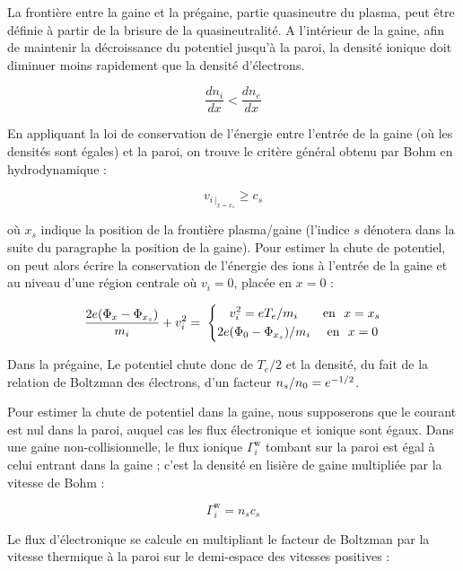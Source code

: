 \begin{refsection}
La frontière entre la gaine et la prégaine, partie quasineutre du plasma, peut
être définie à partir de la brisure de la quasineutralité. A l'intérieur de la
gaine, afin de maintenir la décroissance du potentiel jusqu'à la paroi, la
densité ionique doit diminuer moins rapidement que la densité d'électrons.
 
\begin{equation}
	\frac{dn_{i}}{dx}<\frac{dn_{e}}{dx}
\end{equation}

En appliquant la
loi de conservation de l'énergie entre l'entrée de la gaine (où les densités
sont égales) et la paroi, on trouve le critère général obtenu par Bohm en
hydrodynamique :

\begin{equation}
	v_{{i}\,|_{x=x_s}}\geq c_{s}
\end{equation}

où $x_s$ indique la position de la frontière plasma/gaine (l'indice $s$ dénotera
dans la suite du paragraphe la position de la gaine).
Pour estimer la chute de potentiel, on peut alors écrire la conservation de
l'énergie des ions à l'entrée de la gaine et au niveau d'une région centrale
où $v_{i}=0$, placée en $x=0$ :

\begin{equation}
	\frac{2e(\Phi_{x}-\Phi_{x_{s}})}{m_{i}}+v_{i}^{{2}}=\;\left\{
	\begin{aligned}
	v_i^2=eT_{e}/m_{i}\text{~~~~~~en~~}{x=x_s}\\
	2e(\Phi_{0}-\Phi_{x_{s}})/m_{i}\text{~~~~en~~}{x=0\,}
	\end{aligned}\right.
\end{equation}

Dans la prégaine, Le potentiel chute donc de
$T_{e}/2$ et la densité, du fait de la relation de Boltzman des électrons, d'un
facteur $n_{s}/n{_{0}}=e^{-1/2}$.

Pour estimer la chute de potentiel dans la gaine, nous supposerons que le
courant est nul dans la paroi, auquel cas les flux électronique et ionique sont
égaux. Dans une gaine non-collisionnelle, le flux ionique $\Gamma_i^\text{w}$
tombant sur la paroi est égal à celui entrant dans la gaine ; c'est la densité en lisière de gaine
multipliée par la vitesse de Bohm :

\begin{equation}
\Gamma_i^\text{w}=n_sc_s
\end{equation}

Le flux d'électronique se calcule en multipliant le facteur de
Boltzman par la vitesse thermique à la paroi sur le demi-espace des vitesses
positives :


\end{refsection}
